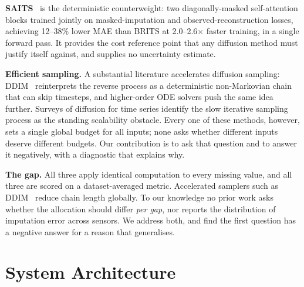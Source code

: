 \documentclass[conference]{IEEEtran}
\begin{document}
\textbf{SAITS}~\cite{saits} is the deterministic counterweight: two
diagonally-masked self-attention blocks trained jointly on masked-imputation and
observed-reconstruction losses, achieving 12--38\% lower MAE than BRITS at
2.0--2.6$\times$ faster training, in a single forward pass. It provides the
cost reference point that any diffusion method must justify itself against, and
supplies no uncertainty estimate.

\textbf{Efficient sampling.} A substantial literature accelerates diffusion
sampling: DDIM~\cite{ddim} reinterprets the reverse process as a deterministic
non-Markovian chain that can skip timesteps, and higher-order ODE solvers push
the same idea further. Surveys of diffusion for time series identify the slow
iterative sampling process as the standing scalability obstacle. Every one of
these methods, however, sets a single global budget for all inputs; none asks
whether different inputs deserve different budgets. Our contribution is to ask
that question and to answer it negatively, with a diagnostic that explains why.

\textbf{The gap.} All three apply identical computation to every missing value,
and all three are scored on a dataset-averaged metric. Accelerated samplers such
as DDIM~\cite{ddim} reduce chain length globally. To our knowledge no prior work
asks whether the allocation should differ \emph{per gap}, nor reports the
distribution of imputation error across sensors. We address both, and find the
first question has a negative answer for a reason that generalises.

\section{System Architecture}
\label{sec:arch}
\end{document}
